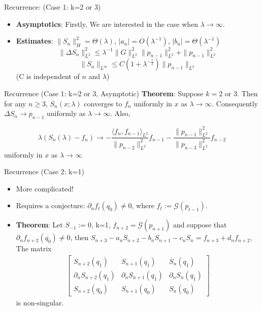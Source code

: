 \documentclass[xcolor = dvipsnames]{beamer}
\newcommand{\lap}{\Delta}
\begin{document}
\begin{frame}{Recurrence: (Case 1: k=2 or 3)}
   \begin{itemize} \item\textbf{Asymptotics}: Firstly, We are interested in the case when $\lambda\rightarrow\infty$.
   \pause
   \item
\textbf{Estimates}: $\|S_n\|_{H}^2=\Theta (\lambda)$, $|a_n|=O(\lambda^{-1})$, $|b_n|=\Theta(\lambda^{-1})$
$$\|\lap S_n\|_{L^2}^2\le \lambda^{-1}\|G\|_{L^2}^2\|p_{n-1}\|_{L^2}^2+\|p_{n-1}\|_{L^2}^2 $$
$$\|S_n\|_{L^{\infty}}\le C(1+\lambda^{-\frac12})\|p_{n-1}\|_{L^2}$$ (C is independent of $n$ and $\lambda$)
\end{itemize}
\end{frame}
\begin{frame}{Recurrence (Case 1: k=2 or 3, Asymptotic)}
    \textbf{Theorem}: Suppose $k=2$ or $3$. Then for any $n\ge3$, $S_n(x;\lambda)$ converges to $f_n$ uniformly in $x$ as $\lambda\rightarrow\infty$. Consequently $\lap S_n\rightarrow p_{n-1}$ uniformly as $\lambda\rightarrow\infty$. Also, 

$$\lambda(S_n(\lambda)-f_n)\rightarrow-\frac{\langle f_n,f_{n-1}\rangle_{L^2}}{\|p_{n-2}\|_{L^2}^2}f_{n-1}-\frac{\|p_{n-1}\|_{L^2}^2}{\|p_{n-3}\|_{L^2}^2}f_{n-2}$$ uniformly in $x$ as $\lambda\rightarrow\infty$

\end{frame}
\begin{frame}{Recurrence (Case 2: k=1)}
    \begin{itemize}
        \item More complicated!\pause
        \item Requires a conjecture: $\partial_n f_t(q_0)\neq 0$, where $f_t:=\mathcal{G} (p_{t-1})$.\pause
\item \textbf{Theorem}: Let $S_{-1}:=0$, k=1, $f_{n+2}= \mathcal{G}(p_{n+1})$ and suppose that $\partial_n f_{n+2}(q_0)\neq 0$, then $S_{n+3}-a_nS_{n+2} - b_nS_{n+1}-c_nS_n = f_{n+3}+d_nf_{n+2}$, The matrix\begin{align}
     \begin{bmatrix}
    S_{n+2}(q_1)&S_{n+1}(q_1)&S_{n}(q_1)\\
    \partial_n S_{n+2}(q_1) &\partial_n S_{n+1}(q_1)&\partial_n S_{n}(q_1)\\
    S_{n+2}(q_0)&S_{n+1}(q_0)&S_{n}(q_0)
    \end{bmatrix} 
\end{align}
is non-singular.

    \end{itemize}
\end{frame}
\end{document}
